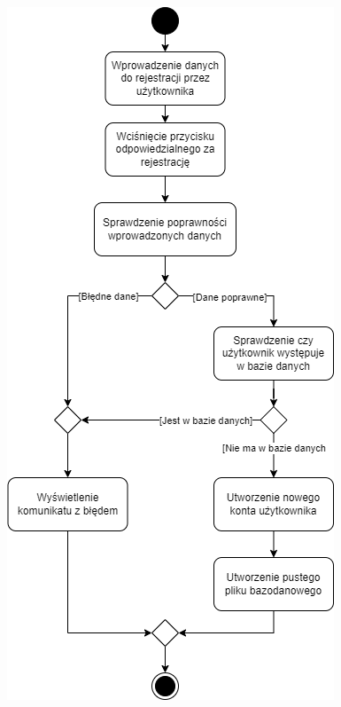 \documentclass[12pt,a4paper]{article} %
\begin{document}
\begin{figure}
	\begin{minipage}{.5\textwidth}
	  \centering
	  \includegraphics[width=.8\textwidth]{images/diagramy_czynnosci/plan-diagram_czynnosci_rejestracja.png}
	  \label{rys:diagram_czynnosci_rejestracja}
	\end{minipage}
\end{figure}
\end{document}

